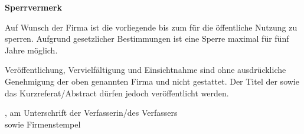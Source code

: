 \thispagestyle{empty}
{\LARGE\bfseries Sperrvermerk}

\vspace{5mm}

Auf Wunsch der Firma \mycompany{} ist die vorliegende \mykindofthesis{} bis zum \myblockinguntil{} für die öffentliche Nutzung zu sperren. Aufgrund gesetzlicher Bestimmungen ist eine Sperre maximal für fünf Jahre möglich. 

\vspace{5mm}

Veröffentlichung, Vervielfältigung und Einsichtnahme sind ohne ausdrückliche Genehmigung der oben genannten Firma und \myauthor{} nicht gestattet. Der Titel der \mykindofthesis{} sowie das Kurzreferat/Abstract dürfen jedoch veröffentlicht werden.

\vspace*{50mm}

\mysubmissiontown, am \mysubmissionday{} \mysubmissionmonth{} \mysubmissionyear{}\hfill Unterschrift der Verfasserin/des Verfassers\\
\hspace*{10cm} sowie Firmenstempel